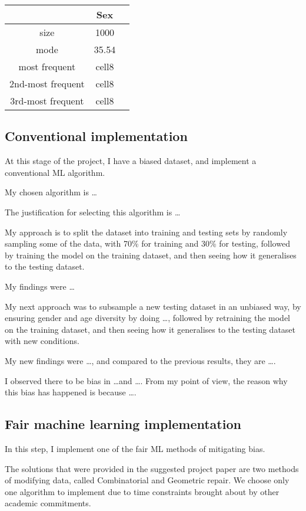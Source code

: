\documentclass[conference]{IEEEtran}
\begin{document}
\begin{center}
    \begin{tabular}{ |c|c|c| } 
        \hline
                        & Sex   \\ 
        \hline
        size               & 1000  \\ 
        mode               & 35.54 \\ 
        most frequent      & cell8 \\ 
        2nd-most frequent  & cell8 \\ 
        3rd-most frequent  & cell8 \\ 
        \hline
    \end{tabular}
\end{center}

\subsection{Conventional implementation}
At this stage of the project, I have a biased dataset, and implement a conventional ML algorithm.

My chosen algorithm is \dots

The justification for selecting this algorithm is \dots

My approach is to split the dataset into training and testing sets by randomly sampling some of the data, with 70\% for training and 30\% for testing, followed by training the model on the training dataset, and then seeing how it generalises to the testing dataset. 

My findings were \dots

My next approach was to subsample a new testing dataset in an unbiased way, by ensuring gender and age diversity by doing \dots, followed by retraining the model on the training dataset, and then seeing how it generalises to the testing dataset with new conditions.

My new findings were \dots, and compared to the previous results, they are \dots.

I observed there to be bias in \dots and \dots. From my point of view, the reason why this bias has happened is because \dots.

\subsection{Fair machine learning implementation}
In this step, I implement one of the fair ML methods of mitigating bias. 

The solutions that were provided in the suggested project paper \cite{Feldman2015ComputationalFP} are two methods of modifying data, called Combinatorial and Geometric repair. We choose only one algorithm to implement due to time constraints brought about by other academic commitments. 
\end{document}
